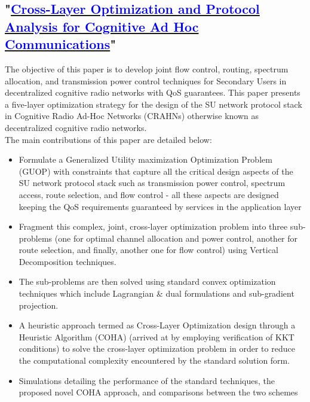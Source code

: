 \documentclass[12pt, draftcls, onecolumn]{IEEEtran}
\begin{document}
\subsection{"\href{http://ieeexplore.ieee.org/stamp/stamp.jsp?tp=&arnumber=7859326&isnumber=7859429}{\textcolor{blue}{Cross-Layer Optimization and Protocol Analysis for Cognitive Ad Hoc Communications}}"}
The objective of this paper is to develop joint flow control, routing, spectrum allocation, and transmission power control techniques for Secondary Users in decentralized cognitive radio networks with QoS guarantees. This paper presents a five-layer optimization strategy for the design of the SU network protocol stack in Cognitive Radio Ad-Hoc Networks (CRAHNs) otherwise known as decentralized cognitive radio networks.
\\The main contributions of this paper are detailed below:
\begin{itemize}
    \item Formulate a Generalized Utility maximization Optimization Problem (GUOP) with constraints that capture all the critical design aspects of the SU network protocol stack such as transmission power control, spectrum access, route selection, and flow control - all these aspects are designed keeping the QoS requirements guaranteed by services in the application layer
    \item Fragment this complex, joint, cross-layer optimization problem into three sub-problems (one for optimal channel allocation and power control, another for route selection, and finally, another one for flow control) using Vertical Decomposition techniques.
    \item The sub-problems are then solved using standard convex optimization techniques which include Lagrangian \& dual formulations and sub-gradient projection.
    \item A heuristic approach termed as Cross-Layer Optimization design through a Heuristic Algorithm (COHA) (arrived at by employing verification of KKT conditions) to solve the cross-layer optimization problem in order to reduce the computational complexity encountered by the standard solution form.
    \item Simulations detailing the performance of the standard techniques, the proposed novel COHA approach, and comparisons between the two schemes
\end{itemize}
\clearpage
\end{document}
